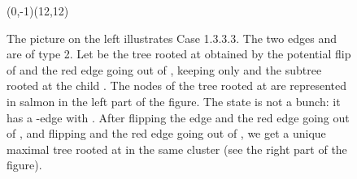 \documentclass[11pt,a4paper]{article}
\begin{document}
\begin{itemize}
\begin{figure}[htbp]
{\begin{VCPicture}{(0,-1)(12,12)}
{
}
\end{VCPicture}}
        \caption{ The picture on the left illustrates Case 1.3.3.3. The
          two edges  and  are of type 2.
          Let  be the tree rooted at  obtained by the
          potential flip of  and the red edge going out
          of , keeping only  and the subtree rooted at the
          child . The nodes of the tree  rooted at  are
          represented in salmon in the left part of the figure.  The
          state  is not a bunch: it has a -edge
           with . After flipping the edge
           and the red edge going out of , and
          flipping  and the red edge going out of
          , we get a unique maximal tree rooted at  in the
          same cluster (see the right part of the figure). }
\label{figure.cluster5}
\end{figure}


\end{itemize}
\end{document}
